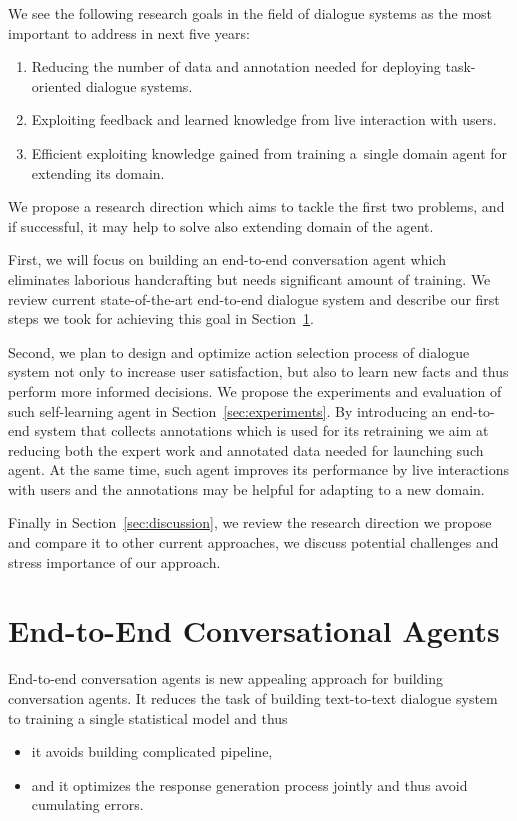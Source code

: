 \documentclass[11pt]{article}
\begin{document}
We see the following research goals in the field of dialogue systems as the most important to address in next five years:
\begin{enumerate}
    \item Reducing the number of data and annotation needed for deploying task-oriented dialogue systems.
    \item Exploiting feedback and learned knowledge from live interaction with users.
    \item Efficient exploiting knowledge gained from training a~single domain agent for extending its domain. 
\end{enumerate}

We propose a research direction which aims to tackle the first two problems, and if successful, it may help to solve also extending domain of the agent.

First, we will focus on building an end-to-end conversation agent which eliminates laborious handcrafting but needs significant amount of training. 
We review current state-of-the-art end-to-end dialogue system and describe our first steps we took for achieving this goal in Section~\ref{sec:e2end}.

Second, we plan to design and optimize action selection process of dialogue system not only to increase user satisfaction, but also to learn new facts and thus perform more informed decisions.
We propose the experiments and evaluation of such self-learning agent in Section~\ref{sec:experiments}.
By introducing an end-to-end system that collects annotations which is used for its retraining we aim at reducing both the expert work and annotated data needed for launching such agent.
At the same time, such agent improves its performance by live interactions with users and the annotations may be helpful for adapting to a new domain.

Finally in Section~\ref{sec:discussion}, we review the research direction we propose and compare it to other current approaches, we discuss potential challenges and stress importance of our approach.

\section{End-to-End Conversational Agents}
\label{sec:e2end}
End-to-end conversation agents is new appealing approach for building conversation agents.
It reduces the task of building text-to-text dialogue system to training a single statistical model and thus
\begin{itemize}
    \item it avoids building complicated pipeline,
    \item and it optimizes the response generation process jointly and thus avoid cumulating errors.
\end{itemize}
\end{document}
